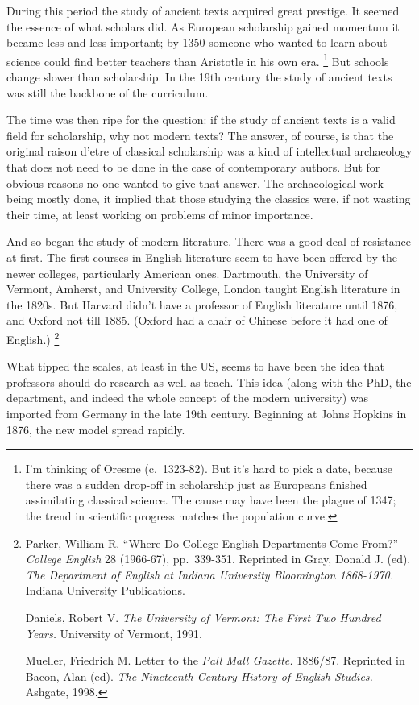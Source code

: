 \documentclass[12pt]{book}
\begin{document}
During this period the study of ancient texts acquired great prestige.
It seemed the essence of what scholars did. As European scholarship
gained momentum it became less and less important; by 1350 someone who
wanted to learn about science could find better teachers than Aristotle
in his own era. \footnote{I'm thinking of Oresme (c.~1323-82). But it's hard to pick a
date, because there was a sudden drop-off in scholarship just as
Europeans finished assimilating classical science. The cause may have
been the plague of 1347; the trend in scientific progress matches the
population curve.} But schools change slower than scholarship. In
the 19th century the study of ancient texts was still the backbone of
the curriculum.

The time was then ripe for the question: if the study of ancient texts
is a valid field for scholarship, why not modern texts? The answer, of
course, is that the original raison d'etre of classical scholarship was
a kind of intellectual archaeology that does not need to be done in the
case of contemporary authors. But for obvious reasons no one wanted to
give that answer. The archaeological work being mostly done, it implied
that those studying the classics were, if not wasting their time, at
least working on problems of minor importance.

And so began the study of modern literature. There was a good deal of
resistance at first. The first courses in English literature seem to
have been offered by the newer colleges, particularly American ones.
Dartmouth, the University of Vermont, Amherst, and University College,
London taught English literature in the 1820s. But Harvard didn't have a
professor of English literature until 1876, and Oxford not till 1885.
(Oxford had a chair of Chinese before it had one of English.) \footnote{Parker, William R. ``Where Do College English Departments Come
From?'' \emph{College English} 28 (1966-67), pp.~339-351. Reprinted in
Gray, Donald J. (ed). \emph{The Department of English at Indiana
University Bloomington 1868-1970.} Indiana University Publications.

Daniels, Robert V. \emph{The University of Vermont: The First Two
Hundred Years.} University of Vermont, 1991.

Mueller, Friedrich M. Letter to the \emph{Pall Mall Gazette.} 1886/87.
Reprinted in Bacon, Alan (ed). \emph{The Nineteenth-Century History of
English Studies.} Ashgate, 1998.}

What tipped the scales, at least in the US, seems to have been the idea
that professors should do research as well as teach. This idea (along
with the PhD, the department, and indeed the whole concept of the modern
university) was imported from Germany in the late 19th century.
Beginning at Johns Hopkins in 1876, the new model spread rapidly.
\end{document}
